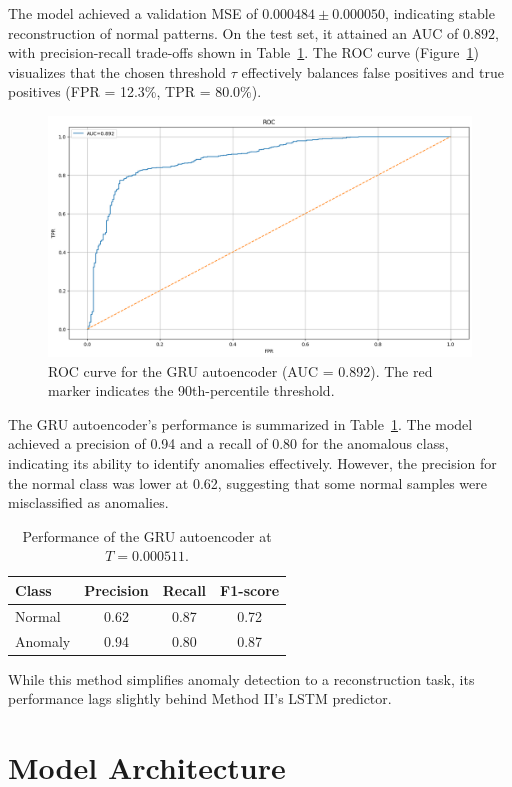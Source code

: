 \documentclass[ngerman]{scrartcl}
\begin{document}
\noindent The model achieved a validation MSE of \(0.000484 \pm 0.000050\), indicating stable reconstruction of normal patterns. On the test set, it attained an AUC of \(0.892\), with precision-recall trade-offs shown in Table~\ref{tab:gru_results}. The ROC curve (Figure~\ref{fig:rocGRU}) visualizes that the chosen threshold \(\tau\) effectively balances false positives and true positives (FPR = 12.3\%, TPR = 80.0\%).
\begin{figure}[h]
    \centering
    \includegraphics[width=\textwidth]{./Figures/ROC_Autoenc.png}
    \caption{ROC curve for the GRU autoencoder (AUC = 0.892). The red marker indicates the 90th-percentile threshold.}
    \label{fig:rocGRU}
\end{figure}
\noindent The GRU autoencoder's performance is summarized in Table~\ref{tab:gru_results}. The model achieved a precision of 0.94 and a recall of 0.80 for the anomalous class, indicating its ability to identify anomalies effectively. However, the precision for the normal class was lower at 0.62, suggesting that some normal samples were misclassified as anomalies.
\begin{table}[H]
    \centering
    \begin{tabular}{lccc}
        \toprule
        Class & Precision & Recall & F1-score \\
        \midrule
        Normal & 0.62 & 0.87 & 0.72 \\
        Anomaly & 0.94 & 0.80 & 0.87 \\
        \bottomrule
    \end{tabular}
    \caption{Performance of the GRU autoencoder at \(T = 0.000511\).}
    \label{tab:gru_results}
\end{table}
\noindent While this method simplifies anomaly detection to a reconstruction task, its performance lags slightly behind Method II's LSTM predictor.%



\section{Model Architecture}
\end{document}
